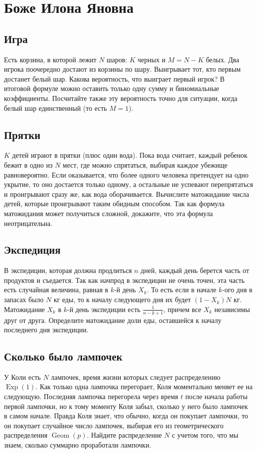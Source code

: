 \documentclass[12pt]{article}
\DeclareMathOperator{\Geom}{Geom}
\DeclareMathOperator{\Exp}{Exp}
\begin{document}
\newpage
\section{Боже Илона Яновна}

\subsection{Игра}
Есть корзина, в которой лежит $N$ шаров: $K$ черных и $M = N - K$ белых. Два игрока поочередно достают из корзины по шару. Выигрывает тот, кто первым достанет белый шар. Какова вероятность, что выиграет первый игрок? В итоговой формуле можно оставить только одну сумму и биномиальные коэффициенты. Посчитайте также эту вероятность точно для ситуации, когда белый шар единственный (то есть $M = 1$).

\subsection{Прятки}
$K$ детей играют в прятки (плюс один вода). Пока вода считает, каждый ребенок бежит в одно из $N$ мест, где можно спрятаться, выбирая каждое убежище равновероятно. Если оказывается, что более одного человека претендует на одно укрытие, то оно достается только одному, а остальные не успевают перепрятаться и проигрывают сразу же, как вода оборачивается. Вычислите матожидание числа детей, которые проигрывают таким обидным способом. Так как формула матожидания может получиться сложной, докажите, что эта формула неотрицательна.

\subsection{Экспедиция}
В экспедиции, которая должна продлиться $n$ дней, каждый день берется часть от продуктов и съедается. Так как начпрод в экспедиции не очень точен, эта часть есть случайная величина, равная в $k$-й день $X_k$. То есть если в начале $k$-ого дня в запасах было $N$ кг еды, то к началу следующего дня их будет $(1 - X_k)N$ кг. Матожидание $X_k$ в $k$-й день экспедиции есть $\frac{1}{n - k + 1}$, причем все $X_k$ независимы друг от друга. Определите матожидание доли еды, оставшейся к началу последнего дня экспедиции.

\subsection{Сколько было лампочек}
У Коли есть $N$ лампочек, время жизни которых следует распределению $\Exp(1)$. Как только одна лампочка перегорает, Коля моментально меняет ее на следующую. Последняя лампочка перегорела через время $t$ после начала работы первой лампочки, но к тому моменту Коля забыл, сколько у него было лампочек в самом начале. Правда Коля знает, что обычно, когда он покупает лампочки, то он покупает случайное число лампочек, выбирая его из геометрического распределения $\Geom(p)$. Найдите распределение $N$ с учетом того, что мы знаем, сколько суммарно проработали лампочки. 
\end{document}
